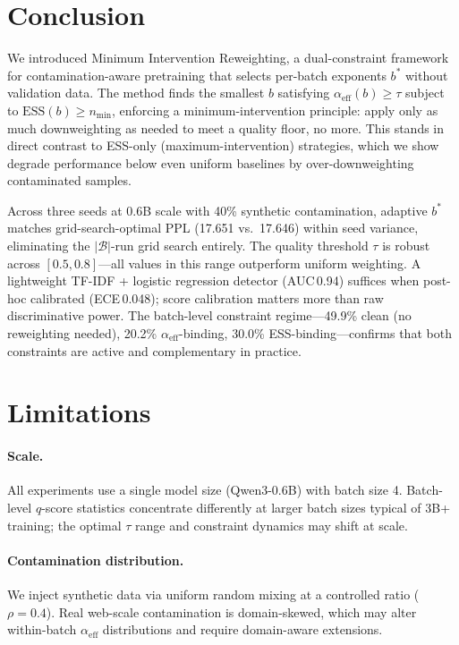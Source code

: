 \section{Conclusion}
\label{sec:conclusion}

We introduced Minimum Intervention Reweighting, a dual-constraint framework for contamination-aware pretraining that selects per-batch exponents $b^*$ without validation data.
The method finds the smallest $b$ satisfying $\alpha_{\mathrm{eff}}(b) \geq \tau$ subject to $\mathrm{ESS}(b) \geq n_{\min}$, enforcing a minimum-intervention principle: apply only as much downweighting as needed to meet a quality floor, no more.
This stands in direct contrast to ESS-only (maximum-intervention) strategies, which we show degrade performance below even uniform baselines by over-downweighting contaminated samples.

Across three seeds at 0.6B scale with 40\% synthetic contamination, adaptive $b^*$ matches grid-search-optimal PPL (17.651 vs.\ 17.646) within seed variance, eliminating the $|\mathcal{B}|$-run grid search entirely.
The quality threshold $\tau$ is robust across $[0.5, 0.8]$---all values in this range outperform uniform weighting.
A lightweight TF-IDF + logistic regression detector (AUC\,0.94) suffices when post-hoc calibrated (ECE\,0.048); score calibration matters more than raw discriminative power.
The batch-level constraint regime---49.9\% clean (no reweighting needed), 20.2\% $\alpha_{\mathrm{eff}}$-binding, 30.0\% ESS-binding---confirms that both constraints are active and complementary in practice.

\section*{Limitations}
\label{sec:limitations}

\paragraph{Scale.}
All experiments use a single model size (Qwen3-0.6B) with batch size 4.
Batch-level $q$-score statistics concentrate differently at larger batch sizes typical of 3B+ training; the optimal $\tau$ range and constraint dynamics may shift at scale.

\paragraph{Contamination distribution.}
We inject synthetic data via uniform random mixing at a controlled ratio ($\rho{=}0.4$).
Real web-scale contamination is domain-skewed, which may alter within-batch $\alpha_{\mathrm{eff}}$ distributions and require domain-aware extensions.

